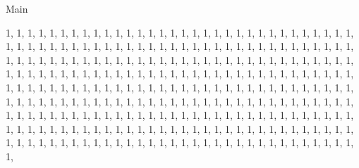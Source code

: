 \begin{lexlean}{Main}
\begin{semanticmodule}
{{      1,
      1,
      1,
      1,
      1,
      1,
      1,
      1,
      1,
      1,
      1,
      1,
      1,
      1,
      1,
      1,
      1,
      1,
      1,
      1,
      1,
      1,
      1,
      1,
      1,
      1,
      1,
      1,
      1,
      1,
      1,
      1,
      1,
      1,
      1,
      1,
      1,
      1,
      1,
      1,
      1,
      1,
      1,
      1,
      1,
      1,
      1,
      1,
      1,
      1,
      1,
      1,
      1,
      1,
      1,
      1,
      1,
      1,
      1,
      1,
      1,
      1,
      1,
      1,
      1,
      1,
      1,
      1,
      1,
      1,
      1,
      1,
      1,
      1,
      1,
      1,
      1,
      1,
      1,
      1,
      1,
      1,
      1,
      1,
      1,
      1,
      1,
      1,
      1,
      1,
      1,
      1,
      1,
      1,
      1,
      1,
      1,
      1,
      1,
      1,
      1,
      1,
      1,
      1,
      1,
      1,
      1,
      1,
      1,
      1,
      1,
      1,
      1,
      1,
      1,
      1,
      1,
      1,
      1,
      1,
      1,
      1,
      1,
      1,
      1,
      1,
      1,
      1,
      1,
      1,
      1,
      1,
      1,
      1,
      1,
      1,
      1,
      1,
      1,
      1,
      1,
      1,
      1,
      1,
      1,
      1,
      1,
      1,
      1,
      1,
      1,
      1,
      1,
      1,
      1,
      1,
      1,
      1,
      1,
      1,
      1,
      1,
      1,
      1,
      1,
      1,
      1,
      1,
      1,
      1,
      1,
      1,
      1,
      1,
      1,
      1,
      1,
      1,
      1,
      1,
      1,
      1,
      1,
      1,
      1,
      1,
      1,
      1,
      1,
      1,
      1,
      1,
      1,
      1,
      1,
      1,
      1,
      1,
      1,
      1,
      1,
      1,
      1,
      1,
      1,
      1,
      1,
      1,
      1,
      1,
      1,
      1,
      1,
      1,
      1,
      1,
      1,
      1,
      1,
      1,
      1,
      1,
      1,
      1,
      1,
      1,
      1,
      1,
      1,
      1,
      1,
      1,
      1,
      1,
      1,
      1,
      1,
      1,
      1,
      1,
      1,
      1,
      1,
      1,
      1,
      1,
      1,
      1,
      1,
      1,
      1,
      1,
      1,
      1,
      1,
      1,
      1,
      1,
      1,
      1,
      1,
      1,
      1,
      1,
      1,
      1,
      1,
      1,
      1,
      1,
      1,
      1,
      1,
      1,
      1,
      1,
      1,
      1,
      1,
      1,
      1,
      1,
      1,
      1,
      1,
      1,
      1,
      1,
      1,
}}
\end{semanticmodule}
\end{lexlean}
